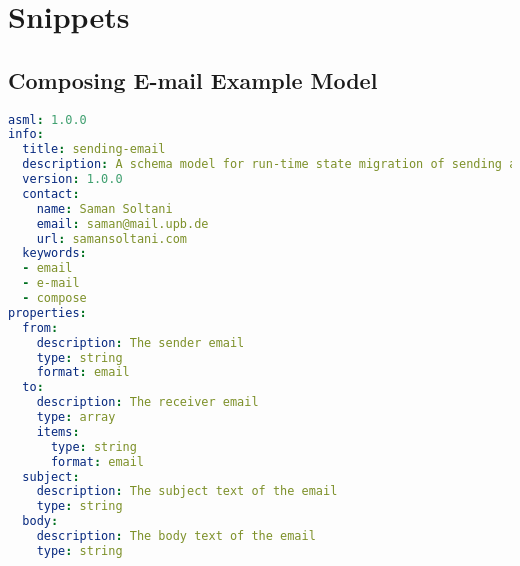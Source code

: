 {}
\chapter*{Snippets} 

\label{appendix:compose-email-schema}
\section{Composing E-mail Example Model}
\lstset{
  label=lis:sending-email-schema, caption=Composing E-mail model as JSON Schema in YAML.,
  breaklines=true
}
\begin{lstlisting}[language=yaml]
asml: 1.0.0
info:
  title: sending-email
  description: A schema model for run-time state migration of sending an email
  version: 1.0.0
  contact:
    name: Saman Soltani
    email: saman@mail.upb.de
    url: samansoltani.com
  keywords:
  - email
  - e-mail
  - compose    
properties:
  from:
    description: The sender email
    type: string
    format: email
  to:
    description: The receiver email
    type: array
    items:
      type: string
      format: email
  subject:
    description: The subject text of the email
    type: string
  body:
    description: The body text of the email
    type: string
\end{lstlisting}

